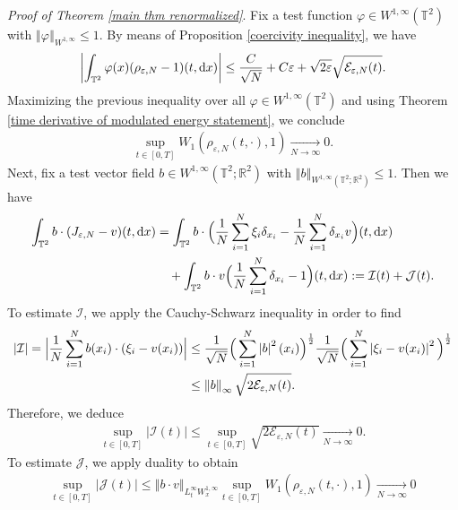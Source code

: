 \documentclass[11pt,reqno]{amsart}
\numberwithin{equation}{section}
\def\dd{{\rm d}}
\begin{document}
\smallskip
\textit{Proof of Theorem \ref{main thm renormalized}}.
Fix a test function $\varphi\in W^{1,\infty}(\mathbb{T}^{2})$ with $\left\Vert \varphi\right\Vert_{W^{1,\infty}}\leq 1$. 
By means of Proposition \ref{coercivity inequality}, we have 
\begin{align*}
\left|\int_{\mathbb{T}^{2}}\varphi(x)(\rho_{\varepsilon,N}-1)(t,\dd x)\right|\leq \frac{C}{\sqrt{N}}+C\varepsilon+\sqrt{2\varepsilon}\sqrt{\mathcal{E}_{\varepsilon,N}(t)}.
\end{align*}
Maximizing the previous inequality  over all $\varphi\in W^{1,\infty}(\mathbb{T}^{2})$  
and using Theorem \ref{time derivative of modulated energy statement}, we conclude 
\begin{align}
\underset{t\in [0,T]}{\sup}W_{1}(\rho_{\varepsilon,N}(t,\cdot),1)\underset{N\rightarrow \infty} {\longrightarrow} 0.  
\label{convergence-rhoN}   
\end{align}
Next, fix a test vector field $b\in W^{1,\infty}(\mathbb{T}
^{2};\mathbb{R}^{2})$ with $\left\Vert b\right\Vert_{W^{1,\infty}(\mathbb{T}^{2};\mathbb{R}^{2})}\leq 1 $. 
Then we have 
\begin{align*}
\int_{\mathbb{T}^{2}}b\cdot (J_{\varepsilon,N}-v)(t,\dd x)
&=\int_{\mathbb{T}^{2}}b\cdot\Big(\frac{1}{N}\sum_{i=1}^{N}\xi_{i}\delta_{x_{i}}-\frac{1}{N}\sum_{i=1}^{N}\delta_{x_{i}}v\Big)(t,\dd x)\\
&\quad+\int_{\mathbb{T}^{2}}b\cdot v\Big(\frac{1}{N}\sum_{i=1}^{N}\delta_{x_{i}}-1\Big)(t,\dd x)
:= \mathcal{I}(t)+\mathcal{J}(t).     
\end{align*}
To estimate $\mathcal{I}$, we apply the Cauchy-Schwarz inequality in order to find 
\begin{align}
|\mathcal{I}|=\Big|\frac{1}{N}\sum_{i=1}^{N}b(x_{i})\cdot (\xi_{i}-v(x_{i}))\Big|
&\leq \frac{1}{\sqrt{N}}\Big(\sum_{i=1}^{N}\left\vert b\right\vert ^{2}(x_{i})\Big)^{\frac{1}{2}}\frac{1}{\sqrt{N}}\Big(\sum_{i=1}^{N}\left\vert \xi_{i}-v(x_{i})\right\vert^{2}\Big)^{\frac{1}{2}} \notag\\
&\leq \left\Vert b\right\Vert_{\infty}\sqrt{2\mathcal{E}_{\varepsilon,N}(t)}. \label{I vanishing}  \end{align}
Therefore, we deduce 
\begin{align*}
\underset{t\in [0,T]}{\sup}|\mathcal{I}(t)|\leq  \underset{t\in [0,T]}{\sup}\sqrt{2\mathcal{E}_{\varepsilon,N}(t)}{\underset{N\rightarrow \infty}{\longrightarrow}0}.
\end{align*}
To estimate $\mathcal{J}$, we apply duality to obtain 
\begin{align}
\underset{t\in [0,T]}{\sup}|\mathcal{J}(t)|\leq \left\Vert b\cdot v\right\Vert_{L^{\infty}_{t}W^{1,\infty}_{x}}\underset{t\in [0,T]}{\sup}W_{1}(\rho_{\varepsilon,N}(t,\cdot),1)\underset{N\rightarrow \infty}{\longrightarrow}0
\label{J vanishing}
\end{align}
\end{document}
